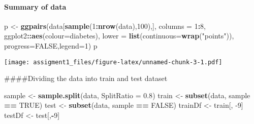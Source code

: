 \documentclass[
]{article}
\newenvironment{Shaded}{\begin{snugshade}}{\end{snugshade}}
\newcommand{\CommentTok}[1]{\textcolor[rgb]{0.56,0.35,0.01}{\textit{#1}}}
\newcommand{\DataTypeTok}[1]{\textcolor[rgb]{0.13,0.29,0.53}{#1}}
\newcommand{\DecValTok}[1]{\textcolor[rgb]{0.00,0.00,0.81}{#1}}
\newcommand{\FloatTok}[1]{\textcolor[rgb]{0.00,0.00,0.81}{#1}}
\newcommand{\KeywordTok}[1]{\textcolor[rgb]{0.13,0.29,0.53}{\textbf{#1}}}
\newcommand{\NormalTok}[1]{#1}
\newcommand{\OperatorTok}[1]{\textcolor[rgb]{0.81,0.36,0.00}{\textbf{#1}}}
\newcommand{\OtherTok}[1]{\textcolor[rgb]{0.56,0.35,0.01}{#1}}
\newcommand{\StringTok}[1]{\textcolor[rgb]{0.31,0.60,0.02}{#1}}
\begin{document}
\hypertarget{summary-of-data}{%
\paragraph{Summary of data}\label{summary-of-data}}

\begin{Shaded}
\begin{Highlighting}[]
\NormalTok{p <-}\StringTok{ }\KeywordTok{ggpairs}\NormalTok{(data[}\KeywordTok{sample}\NormalTok{(}\DecValTok{1}\OperatorTok{:}\KeywordTok{nrow}\NormalTok{(data),}\DecValTok{100}\NormalTok{),], }\DataTypeTok{columns =} \DecValTok{1}\OperatorTok{:}\DecValTok{8}\NormalTok{, ggplot2}\OperatorTok{::}\KeywordTok{aes}\NormalTok{(}\DataTypeTok{colour=}\NormalTok{diabetes), }\DataTypeTok{lower =} \KeywordTok{list}\NormalTok{(}\DataTypeTok{continuous=}\KeywordTok{wrap}\NormalTok{(}\StringTok{"points"}\NormalTok{)), }\DataTypeTok{progress=}\OtherTok{FALSE}\NormalTok{,}\DataTypeTok{legend=}\DecValTok{1}\NormalTok{)}
\NormalTok{p}
\end{Highlighting}
\end{Shaded}

\texttt{[image: assigment1\_files/figure-latex/unnamed-chunk-3-1.pdf]}

\#\#\#\#Dividing the data into train and test dataset

\begin{Shaded}
\begin{Highlighting}[]
\NormalTok{sample <-}\StringTok{ }\KeywordTok{sample.split}\NormalTok{(data, }\DataTypeTok{SplitRatio =} \FloatTok{0.8}\NormalTok{)}
\NormalTok{train <-}\StringTok{ }\KeywordTok{subset}\NormalTok{(data, sample }\OperatorTok{==}\StringTok{ }\OtherTok{TRUE}\NormalTok{)}
\NormalTok{test  <-}\StringTok{ }\KeywordTok{subset}\NormalTok{(data, sample }\OperatorTok{==}\StringTok{ }\OtherTok{FALSE}\NormalTok{)}
\NormalTok{trainDf <-}\StringTok{ }\NormalTok{train[, }\DecValTok{-9}\NormalTok{]}
\NormalTok{testDf <-}\StringTok{ }\NormalTok{test[,}\OperatorTok{-}\DecValTok{9}\NormalTok{]}
\end{Highlighting}
\end{Shaded}

\begin{Shaded}
\end{Shaded}
\end{document}
